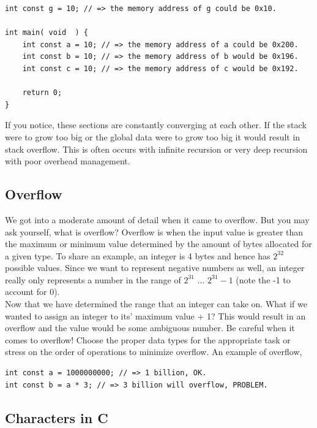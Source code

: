 \documentclass[12pt,extarticle]{article}
\begin{document}
\lstset {
	language=c
}
\begin{lstlisting}
int const g = 10; // => the memory address of g could be 0x10.

int main( void  ) {
	int const a = 10; // => the memory address of a could be 0x200.
	int const b = 10; // => the memory address of b would be 0x196.
	int const c = 10; // => the memory address of c would be 0x192.
	
	return 0;
}
\end{lstlisting}

If you notice, these sections are constantly converging at each other. If the stack were to grow too big or the global data were to grow too big it would result in stack overflow. This is often occurs with infinite recursion or very deep recursion with poor overhead management.

\subsection{Overflow}

We got into a moderate amount of detail when it came to overflow. But you may ask yourself, what is overflow? Overflow is when the input value is greater than the maximum or minimum value determined by the amount of bytes allocated for a given type. To share an example, an integer is 4 bytes and hence has $2^{32}$ possible values. Since we want to represent negative numbers as well, an integer really only represents a number in the range of $2^{31}$ ... $2^{31} - 1$ (note the -1 to account for 0).\\

Now that we have determined the range that an integer can take on. What if we wanted to assign an integer to its' maximum value + 1? This would result in an overflow and the value would be some ambiguous number. Be careful when it comes to overflow! Choose the proper data types for the appropriate task or stress on the order of operations to minimize overflow. An example of overflow,\\

\lstset {
	language=c
}
\begin{lstlisting}
int const a = 1000000000; // => 1 billion, OK.
int const b = a * 3; // => 3 billion will overflow, PROBLEM.
\end{lstlisting}

\subsection{Characters in C}
\end{document}
